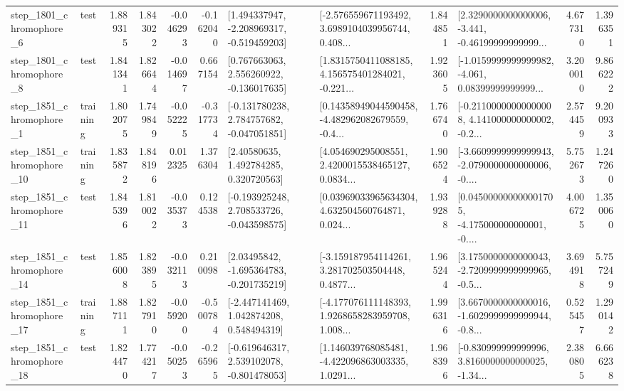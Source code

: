 \begin{tabular}{llrrrrllrlrr}
  step\_1801\_chromophore\_6 &      test &      1.889315 &    1.843022 &     -0.046293 & -0.162040 &   [1.494337947, -2.208969317, -0.519459203] &  [-2.576559671193492, 3.6989104039956744, 0.408... &       1.844851 &  [2.3290000000000006, -3.441, -0.46199999999999... &            4.677310 &          1.396351 \\
  step\_1801\_chromophore\_8 &      test &      1.841341 &    1.826644 &     -0.014697 &  0.667154 &    [0.767663063, 2.556260922, -0.136017635] &  [1.8315750411088185, 4.156575401284021, -0.221... &       1.923605 &  [-1.0159999999999982, -4.061, 0.08399999999999... &            3.200010 &          9.866222 \\
  step\_1851\_chromophore\_1 &  training &      1.802075 &    1.749849 &     -0.052225 & -0.317734 &   [-0.131780238, 2.784757682, -0.047051851] &  [0.14358949044590458, -4.482962082679559, -0.4... &       1.766740 &  [-0.21100000000000008, 4.141000000000002, -0.2... &            2.574459 &          9.200933 \\
 step\_1851\_chromophore\_10 &  training &      1.835872 &    1.848196 &      0.012325 &  1.376304 &      [2.40580635, 1.492784285, 0.320720563] &  [4.054690295008551, 2.4200015538465127, 0.0834... &       1.906524 &  [-3.6609999999999943, -2.0790000000000006, -0.... &            5.752673 &          1.247260 \\
 step\_1851\_chromophore\_11 &      test &      1.845396 &    1.810022 &     -0.035373 &  0.124538 &   [-0.193925248, 2.708533726, -0.043598575] &  [0.03969033965634304, 4.632504560764871, 0.024... &       1.939288 &  [0.045000000000001705, -4.175000000000001, -0.... &            4.006725 &          1.350060 \\
 step\_1851\_chromophore\_14 &      test &      1.856008 &    1.823895 &     -0.032113 &  0.210098 &    [2.03495842, -1.695364783, -0.201735219] &  [-3.159187954114261, 3.281702503504448, 0.4877... &       1.965244 &  [3.1750000000000043, -2.7209999999999965, -0.5... &            3.694918 &          5.757249 \\
 step\_1851\_chromophore\_17 &  training &      1.887111 &    1.827910 &     -0.059200 & -0.500784 &    [-2.447141469, 1.042874208, 0.548494319] &  [-4.177076111148393, 1.9268658283959708, 1.008... &       1.996316 &  [3.6670000000000016, -1.6029999999999944, -0.8... &            0.525457 &          1.290142 \\
 step\_1851\_chromophore\_18 &      test &      1.824470 &    1.774217 &     -0.050253 & -0.265965 &   [-0.619646317, 2.539102078, -0.801478053] &  [1.146039768085481, -4.422096863003335, 1.0291... &       1.968396 &  [-0.830999999999996, 3.8160000000000025, -1.34... &            2.380805 &          6.666238 \\

\end{tabular}
